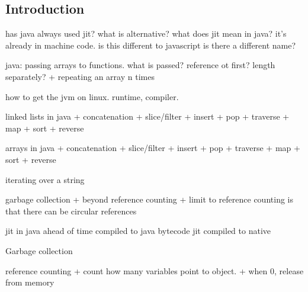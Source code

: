 
\subsection{Introduction}

has java always used jit? what is alternative?
what does jit mean in java? it's already in machine code. is this different to javascript is there a different name?


java:
passing arrays to functions. what is passed? reference ot first? length separately?
+ repeating an array n times


how to get the jvm on linux. runtime, compiler.

linked lists in java
+ concatenation
+ slice/filter
+ insert
+ pop
+ traverse
+ map
+ sort
+ reverse

arrays in java
+ concatenation
+ slice/filter
+ insert
+ pop
+ traverse
+ map
+ sort
+ reverse

iterating over a string


garbage collection
+ beyond reference counting
+ limit to reference counting is that there can be circular references


jit in java
ahead of time compiled to java bytecode
jit compiled to native

Garbage collection

reference counting
+ count how many variables point to object.
+ when 0, release from memory

